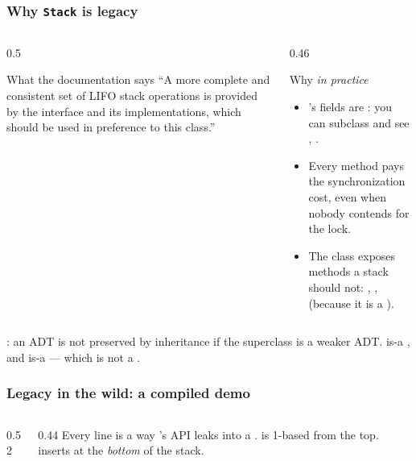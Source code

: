 \documentclass[aspectratio=169,10pt,compress]{beamer}
\begin{document}
\begin{frame}[t,fragile] \frametitle{Why \texttt{Stack} is legacy}
  \begin{columns}[T]
    \begin{column}{0.5\textwidth}
      \begin{block}{What the documentation says}
        \small
        ``A more complete and consistent set of LIFO stack operations is
        provided by the  interface and its implementations,
        which should be used in preference to this class.''
      \end{block}
    \end{column}
    \begin{column}{0.46\textwidth}
      \begin{block}{Why \emph{in practice}}
        \small
        \begin{itemize}
          \item {}'s fields are : you can
                subclass and see , .
          \item Every method pays the synchronization cost, even when
                nobody contends for the lock.
          \item The class exposes methods a stack should not:
                , , 
                (because it is a ).
        \end{itemize}
      \end{block}
    \end{column}
  \end{columns}
  \vspace{0.3em}
  \small
  : an ADT is not preserved by inheritance if the
  superclass is a weaker ADT.  is-a , and
   is-a  --- which is not a .
\end{frame}




\begin{frame}[t,fragile] \frametitle{Legacy in the wild: a compiled demo}
  \begin{columns}[T]
    \begin{column}{0.52\textwidth}
    \end{column}
    \begin{column}{0.44\textwidth}
      \small
      Every line is a way 's API leaks into a .
       is 1-based from the top.
       inserts at the \emph{bottom} of the stack.
    \end{column}
  \end{columns}
\end{frame}
\end{document}
